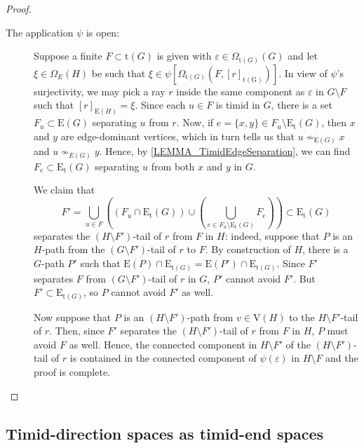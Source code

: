 \documentclass[10pt]{article}
\newcommand{\myref}[1]{\hyperref[#1]{\namecref{#1} \ref{#1}}}
\numberwithin{equation}{subsection}
\theoremstyle{remark}
\begin{document}
\begin{proof}
\begin{description}
        \item[The application $\psi$ is open:] Suppose a finite $F\subset \mathrm{t}(G)$ is given with $\varepsilon\in \Omega_{\mathrm{t}(G)}(G)$ and let $\xi\in \Omega_{E}(H)$ be such that $\xi\in \psi[\Omega_{\mathrm{t}(G)}(F,[r]_{\mathrm{t(G)}})]$. In view of $\psi$'s surjectivity, we may pick a ray $r$ inside the same component as $\varepsilon$ in $G\setminus F$ such that $[r]_{\mathrm{E}(H)} = \xi$. Since each $u\in F$ is timid in $G$, there is a set $F_u\subset \mathrm{E}(G)$ separating $u$ from $r$. Now, if $e=\{x,y\}\in F_u\setminus \mathrm{E}_\mathrm{t}(G)$, then $x$ and $y$ are edge-dominant vertices, which in turn tells us that $u\nsim_{\mathrm{E}(G)} x$ and $u\nsim_{E(G)} y$. Hence, by \myref{LEMMA_TimidEdgeSeparation}, we can find $F_e\subset \mathrm{E}_\mathrm{t}(G)$ separating $u$ from both $x$ and $y$ in $G$. 
        
        We claim that
        \[F' = \bigcup_{u\in F}\left((F_u\cap \mathrm{E}_\mathrm{t}(G))\cup \left(\bigcup_{e\in F_u\setminus \mathrm{E}_\mathrm{t}(G)}F_e\right)\right)\subset \mathrm{E}_\mathrm{t}(G)\]
        separates the $(H\setminus F')$-tail of $r$ from $F$ in $H$: indeed, suppose that $P$ is an $H$-path from the $(G\setminus F')$-tail of $r$ to $F$. By construction of $H$, there is a $G$-path $P'$ such that $\mathrm{E}(P)\cap \mathrm{E}_{\mathrm{t}(G)} = \mathrm{E}(P')\cap \mathrm{E}_{\mathrm{t}(G)}$. Since $F'$ separates $F$ from $(G\setminus F')$-tail of $r$ in $G$, $P'$ cannot avoid $F'$. But $F'\subset \mathrm{E}_{\mathrm{t}(G)}$, so $P$ cannot avoid $F'$ as well.
        

        Now suppose that $P$ is an $(H\setminus F')$-path from $v\in \mathrm{V}(H)$ to the $H\setminus F'$-tail of $r$. Then, since $F'$ separates the $(H\setminus F')$-tail of $r$ from $F$ in $H$, $P$ must avoid $F$ as well. Hence, the connected component in $H\setminus F'$ of the $(H\setminus F')$-tail of $r$ is contained in the connected component of $\psi(\varepsilon)$ in $H\setminus F$ and
        the proof is complete.
    \end{description}
\end{proof}





\subsection{Timid-direction spaces as timid-end spaces}\label{timid-direciton-end2}
\end{document}
